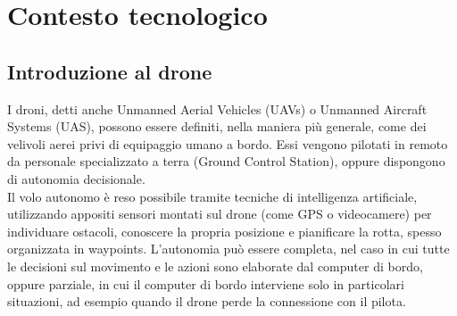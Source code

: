 
\chapter{Contesto tecnologico}

\ifpdf
    \graphicspath{{Chapter2/Figs/Raster/}{Chapter2/Figs/PDF/}{Chapter2/Figs/}}
\else
    \graphicspath{{Chapter2/Figs/Vector/}{Chapter2/Figs/}}
\fi


\section[Introduzione al drone]{Introduzione al drone}

I droni, detti anche Unmanned Aerial Vehicles (UAVs) o Unmanned Aircraft Systems (UAS), possono essere definiti, nella maniera più generale, come dei velivoli aerei privi di equipaggio umano a bordo. Essi vengono pilotati in remoto da personale specializzato a terra (Ground Control Station), oppure dispongono di autonomia decisionale. \\
Il volo autonomo è reso possibile tramite tecniche di intelligenza artificiale, utilizzando appositi sensori montati sul drone (come GPS o videocamere) per individuare ostacoli, conoscere la propria posizione e pianificare la rotta, spesso organizzata in waypoints. 
L'autonomia può essere completa, nel caso in cui tutte le decisioni sul movimento e le azioni sono elaborate dal computer di bordo, oppure parziale, in cui il computer di bordo interviene solo in particolari situazioni, ad esempio quando il drone perde la connessione con il pilota. \\

